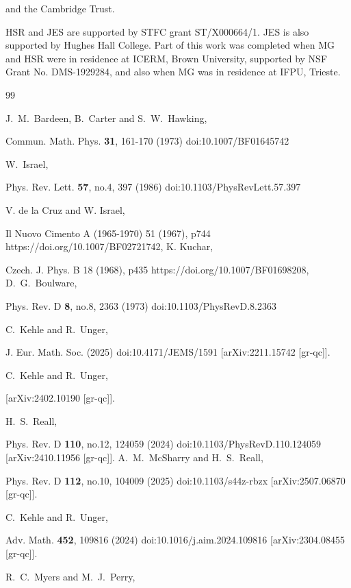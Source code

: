 \documentclass[prl,twocolumn,superscriptaddress,nofootinbib]{revtex4-2}
\begin{document}
and the Cambridge Trust.

HSR and JES are supported by STFC grant ST/X000664/1. JES is also supported by Hughes Hall College. Part of this work was completed when MG and HSR were in residence at ICERM, Brown University, supported by NSF Grant No. DMS-1929284, and also when MG was in residence at IFPU, Trieste.

\begin{thebibliography}{99}


J.~M.~Bardeen, B.~Carter and S.~W.~Hawking,

Commun. Math. Phys. \textbf{31}, 161-170 (1973)
doi:10.1007/BF01645742


W.~Israel,

Phys. Rev. Lett. \textbf{57}, no.4, 397 (1986)
doi:10.1103/PhysRevLett.57.397

V. de la Cruz and W. Israel,

Il Nuovo Cimento A (1965-1970) 51 (1967), p744
https://doi.org/10.1007/BF02721742,
K. Kuchar,

Czech. J. Phys. B 18 (1968), p435
https://doi.org/10.1007/BF01698208,
D.~G.~Boulware,

Phys. Rev. D \textbf{8}, no.8, 2363 (1973)
doi:10.1103/PhysRevD.8.2363



C.~Kehle and R.~Unger,

J. Eur. Math. Soc. (2025) doi:10.4171/JEMS/1591
[arXiv:2211.15742 [gr-qc]].



C.~Kehle and R.~Unger,

[arXiv:2402.10190 [gr-qc]].



H.~S.~Reall,

Phys. Rev. D \textbf{110}, no.12, 124059 (2024)
doi:10.1103/PhysRevD.110.124059
[arXiv:2410.11956 [gr-qc]].
A.~M.~McSharry and H.~S.~Reall,

Phys. Rev. D \textbf{112}, no.10, 104009 (2025)
doi:10.1103/s44z-rbzx
[arXiv:2507.06870 [gr-qc]].



C.~Kehle and R.~Unger,

Adv. Math. \textbf{452}, 109816 (2024)
doi:10.1016/j.aim.2024.109816
[arXiv:2304.08455 [gr-qc]].



R.~C.~Myers and M.~J.~Perry,


\end{thebibliography}
\end{document}
